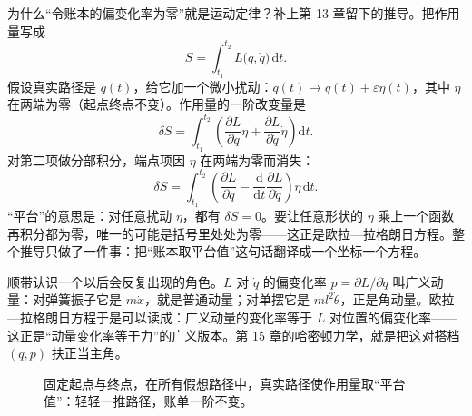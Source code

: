 \begin{mathbridge}
为什么“令账本的偏变化率为零”就是运动定律？补上第 13 章留下的推导。把作用量写成
\[
S=\int_{t_1}^{t_2} L\bigl(q,\dot{q}\bigr)\,\mathrm{d}t .
\]
假设真实路径是 \(q(t)\)，给它加一个微小扰动：\(q(t)\to q(t)+\varepsilon\eta(t)\)，其中 \(\eta\) 在两端为零（起点终点不变）。作用量的一阶改变量是
\[
\delta S=\int_{t_1}^{t_2}\left(\frac{\partial L}{\partial q}\eta+\frac{\partial L}{\partial \dot q}\dot{\eta}\right)\mathrm{d}t .
\]
对第二项做分部积分，端点项因 \(\eta\) 在两端为零而消失：
\[
\delta S=\int_{t_1}^{t_2}\left(\frac{\partial L}{\partial q}-\frac{\mathrm{d}}{\mathrm{d}t}\frac{\partial L}{\partial \dot q}\right)\eta\,\mathrm{d}t .
\]
“平台”的意思是：对任意扰动 \(\eta\)，都有 \(\delta S=0\)。要让任意形状的 \(\eta\) 乘上一个函数再积分都为零，唯一的可能是括号里处处为零——这正是欧拉—拉格朗日方程。整个推导只做了一件事：把“账本取平台值”这句话翻译成一个坐标一个方程。

顺带认识一个以后会反复出现的角色。\(L\) 对 \(\dot{q}\) 的偏变化率 \(p=\partial L/\partial\dot{q}\) 叫广义动量：对弹簧振子它是 \(m\dot{x}\)，就是普通动量；对单摆它是 \(ml^2\dot{\theta}\)，正是角动量。欧拉—拉格朗日方程于是可以读成：广义动量的变化率等于 \(L\) 对位置的偏变化率——这正是“动量变化率等于力”的广义版本。第 15 章的哈密顿力学，就是把这对搭档 \((q,p)\) 扶正当主角。
\end{mathbridge}

\begin{figure}[htbp]
\centering
{}
\caption{固定起点与终点，在所有假想路径中，真实路径使作用量取“平台值”：轻轻一推路径，账单一阶不变。}
\end{figure}

